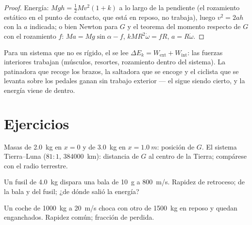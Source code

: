 \begin{proof}
Energía: $Mgh = \tfrac12 Mv^2(1 + k)$ a lo largo de la pendiente (el
rozamiento estático en el punto de contacto, que está en reposo, no
trabaja), luego $v^2 = 2ah$ con la $a$ indicada; o bien Newton para $G$ y
el teorema del momento respecto de $G$ con el rozamiento $f$:
$Ma = Mg\sin\alpha - f$, $kMR^2\dot\omega = fR$, $a = R\dot\omega$.
\end{proof}

\begin{remark}\label{rem:b1:systems-of-points:deformable}
Para un sistema que no es rígido, el  se lee
$\Delta E_k = W_{\mathrm{ext}} + W_{\mathrm{int}}$: las fuerzas interiores
trabajan (músculos, resortes, rozamiento dentro del sistema). La
patinadora que recoge los brazos, la saltadora que se encoge y el ciclista
que se levanta sobre los pedales ganan  sin trabajo
exterior --- el  sigue siendo cierto, y la
energía viene de dentro.
\end{remark}

\section{Ejercicios}

\begin{exercise}[$\star$]\label{exo:b1:systems-of-points:1}
Masas de \qty{2.0}{kg} en $x = 0$ y de \qty{3.0}{kg} en $x = \qty{1.0}{m}$:
posición de $G$. El sistema Tierra--Luna ($81:1$, \qty{384000}{km}):
distancia de $G$ al centro de la Tierra; compárese con el radio
terrestre.
\end{exercise}

\begin{exercise}[$\star$]\label{exo:b1:systems-of-points:2}
Un fusil de \qty{4.0}{kg} dispara una bala de \qty{10}{g} a \qty{800}{m/s}.
Rapidez de retroceso;  de la bala y del fusil; ¿de dónde
salió la energía?
\end{exercise}

\begin{exercise}[$\star$]\label{exo:b1:systems-of-points:3}
Un coche de \qty{1000}{kg} a \qty{20}{m/s} choca con otro de \qty{1500}{kg}
en reposo y quedan enganchados. Rapidez común; fracción de  perdida.
\end{exercise}

